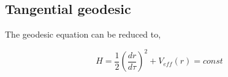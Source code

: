 \documentclass[12pt,a4paper]{article}
\begin{document}
	\subsection{Tangential geodesic}
	
	The geodesic equation can be reduced to,
	
	\begin{equation}
		H = \frac{1}{2} \left(\frac{d r}{d \tau}\right)^2 + V_{eff}(r) = const
	\end{equation} 
	
	

	
	
	
	
	
	
	
	
	
	
	
	
	
	
	
	
	
	
	
	
	
	
	
	

	

	
	
	
	
	
	
\end{document}
